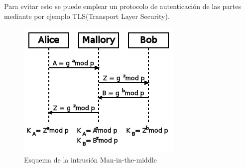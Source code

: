 \documentclass[10pt, conference]{IEEEtran}
\begin{document}
Para evitar esto se puede emplear un protocolo de autenticación de las partes mediante por ejemplo TLS(Transport Layer Security).

\begin{figure}[h]
\begin{center}
\includegraphics[scale=0.60]{man.png} \end{center}
\caption{Esquema de la intrusión Man-in-the-middle}
\end{figure}






\end{document}
